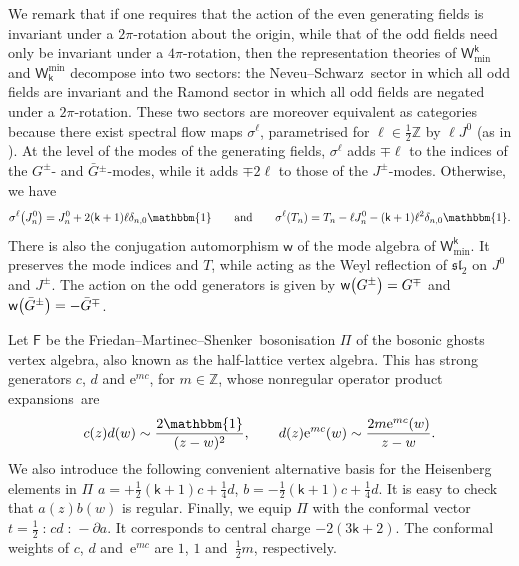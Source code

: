 \documentclass[10pt,a4paper]{amsart}
\numberwithin{equation}{section}
\newcommand{\pd}{\partial} %
\newcommand{\wun}{\mathbbm{1}} %
\newcommand{\bG}{\bar{G}{}}
\newcommand{\ee}{\mathrm{e}} %
\newcommand{\kk}{\mathsf{k}} %
\DeclarePairedDelimiter{\brac}{\lparen}{\rparen} %
\newcommand{\no}[1]{\mathopen{:} #1 \mathclose{:}} %
\newcommand{\fld}[1]{\mathbb{#1}} %
\newcommand{\alg}[1]{\mathfrak{#1}} %
\newcommand{\VOA}[1]{\mathsf{#1}} %
\newcommand{\ZZ}{\fld{Z}}
\newcommand{\SLA}[2]{\alg{#1}_{#2}} %
\newcommand{\sltwo}{\SLA{sl}{2}}
\newcommand{\lsymb}{\Pi}
\newcommand{\lvoa}{\lsymb} %
\newcommand{\uwalg}[2]{\VOA{W}^{#1}_{\mathrm{#2}}} %
\newcommand{\swalg}[2]{\VOA{W}_{#1}^{\mathrm{#2}}} %
\newcommand{\umin}[1][\kk]{\uwalg{#1}{min}} %
\newcommand{\smin}[1][\kk]{\swalg{#1}{min}} %
\newcommand{\nconjsymb}{\mathsf{w}} %
\newcommand{\nconj}{\nconjsymb \brac}
\newcommand{\nsfsymb}[1]{\sigma^{#1}} %
\newcommand{\nsf}[1]{\nsfsymb{#1} \brac}
\newcommand{\fms}{Friedan--Martinec--Shenker}
\newcommand{\ns}{Neveu--Schwarz}
\newcommand{\va}{vertex algebra}
\newcommand{\ope}{operator product expansion}
\newcommand{\opes}{\ope s}
\begin{document}
We remark that if one requires that the action of the even generating fields is invariant under a $2\pi$-rotation about the origin, while that of the odd fields need only be invariant under a $4\pi$\nobreakdash-rotation, then the representation theories of $\umin$ and $\smin$ decompose into two sectors: the \ns\ sector in which all odd fields are invariant and the Ramond sector in which all odd fields are negated under a $2\pi$-rotation.
These two sectors are moreover equivalent as categories because there exist spectral flow maps $\nsfsymb{\ell}$, parametrised for $\ell \in \frac{1}{2}\ZZ$ by $\ell J^0$ (as in \cite{LiPhy97}).
At the level of the modes of the generating fields, $\nsfsymb{\ell}$ adds $\mp\ell$ to the indices of the $G^{\pm}$- and $\bG^{\pm}$-modes, while it adds $\mp2\ell$ to those of the $J^{\pm}$-modes.
Otherwise, we have
\begin{equation} \label{eq:N=4sf}
	\nsf{\ell}[\big]{J^0_n} = J^0_n + 2(\kk+1)\ell\delta_{n,0}\wun \qquad \text{and} \qquad
	\nsf{\ell}{T_n} = T_n - \ell J^0_n- (\kk+1)\ell^2\delta_{n,0}\wun.
\end{equation}
There is also the conjugation automorphism $\nconjsymb$ of the mode algebra of $\umin$.
It preserves the mode indices and $T$, while acting as the Weyl reflection of $\sltwo$ on $J^0$ and $J^{\pm}$.
The action on the odd generators is given by
$%
	\nconj[\big]{G^{\pm}} = G^{\mp} $ and $\nconj[\big]{\bG^{\pm}} = -\bG^{\mp}$.

Let $\VOA{F}$ be the \fms\ bosonisation $\lvoa$ of the bosonic ghosts \va, also known as the half-lattice vertex algebra.
This has strong generators $c$, $d$ and $\ee^{mc}$, for $m \in \ZZ$, whose nonregular \opes\ are \cite{FriCon86}
\[
	c(z) d(w) \sim \frac{2 \wun}{(z-w)^2}, \qquad
	d(z) \ee^{mc}(w) \sim \frac{2m \ee^{mc}(w)}{z-w}.
\]
We also introduce the following convenient alternative basis for the Heisenberg elements in $\lvoa$
$a = +\frac{1}{2} (\kk+1)c + \frac{1}{4} d$, $
	b = -\frac{1}{2} (\kk+1)c + \frac{1}{4} d$.
It is easy to check that $a(z) b(w)$ is regular.
Finally, we equip $\lvoa$ with the conformal vector
$t = \frac{1}{2} \no{cd} - \pd a$.
It corresponds to central charge $-2(3\kk+2)$.
The conformal weights of $c$, $d$ and~$\ee^{mc}$ are $1$, $1$ and~$\frac{1}{2}m$, respectively.
\end{document}
